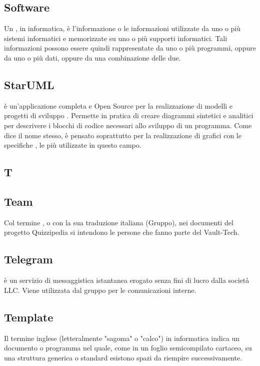 \subsection{Software}
Un , in informatica, è l'informazione o le informazioni utilizzate da uno o più
sistemi informatici e memorizzate su uno o più supporti informatici. Tali informazioni possono
essere quindi rappresentate da uno o più programmi, oppure da uno o più dati, oppure
da una combinazione delle due.

\subsection{StarUML}
 è un'applicazione completa e Open Source per la realizzazione di modelli e progetti di sviluppo . Permette in pratica di creare diagrammi sintetici e analitici per descrivere i blocchi di codice necessari allo sviluppo di un programma. Come dice il nome stesso,  è pensato soprattutto per la realizzazione di grafici con le specifiche , le più utilizzate in questo campo.

\newpage

\begin{center}
\Huge\section{\uppercase{T}}
\end{center}

\subsection{Team}
Col termine , o con la sua traduzione italiana (Gruppo), nei documenti del progetto
Quizzipedia si intendono le persone che fanno parte del Vault-Tech.


\subsection{Telegram}
 è un servizio di messaggistica istantanea erogato senza fini di lucro dalla società  LLC. Viene utilizzata dal gruppo per le comunicazioni interne.

\subsection{Template}
Il termine inglese  (letteralmente "sagoma" o "calco") in informatica
indica un documento o programma nel quale, come in un foglio semicompilato
cartaceo, su una struttura generica o standard esistono spazi da riempire
successivamente.

